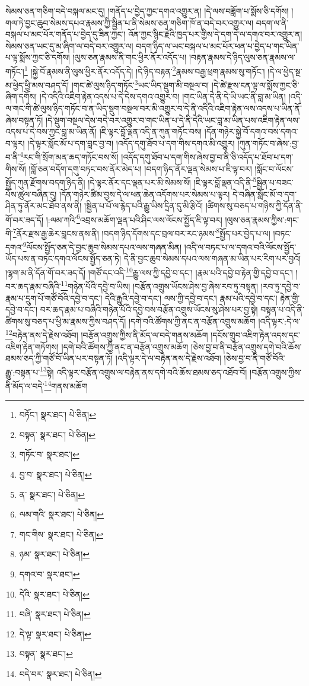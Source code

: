 སེམས་ཅན་གཅིག་བདེ་བསྐལ་མང་དུ། །གནོད་པ་བྱེད་ཀྱང་དགའ་འགྱུར་ན། །དེ་ལས་བཟློག་པ་སྨོས་ཅི་དགོས། །གལ་ཏེ་བྱང་ཆུབ་སེམས་དཔའ་རྣམས་ཀྱི་སྦྱིན་པ་ནི་སེམས་ཅན་གཅིག་ཁོ་ན་བདེ་བར་འགྱུར་ལ། བདག་ལ་ནི་བསྐལ་པ་མང་པོར་གནོད་པ་བྱེད་དུ་ཟིན་ཀྱང་། འོན་ཀྱང་སྙིང་རྗེའི་ཁྱད་པར་གྱིས་དེ་དག་དེ་ལ་དགའ་བར་འགྱུར་ན། སེམས་ཅན་ཡང་དུ་མ་ཞིག་ལ་བདེ་བར་འགྱུར་ལ། བདག་ཉིད་ལ་ཡང་བསྐལ་པ་མང་པོར་ཕན་པ་བྱེད་པ་གང་ཡིན་པ་ལྟ་སྨོས་ཀྱང་ཅི་དགོས། །ལུས་ཅན་རྣམས་ནི་གང་ཕྱིར་ནོར་འདོད་པ། །བརྟན་རྣམས་དེ་ཉིད་ལུས་ཅན་རྣམས་ལ་གཏོང་།\footnote{བཏོང་།  སྣར་ཐང་།  པེ་ཅིན། } །སྐྱེ་བོ་རྣམས་ནི་ལུས་ཕྱིར་ནོར་འདོད་དེ། །དེ་ཉིད་བརྟན་\footnote{བསྟན་  སྣར་ཐང་།  པེ་ཅིན། }རྣམས་བརྒྱ་ཕྲག་རྣམས་སུ་གཏོང་། །དེ་ལ་ཕྱེད་སྔ་མ་ཕྱེད་ཕྱི་མས་བཤད་དོ། །གང་ཚེ་ལུས་ཉིད་གཏོང་\footnote{གཏོང་བ་  སྣར་ཐང་། }ཡང་ཡིད་སྡུག་མི་བསྔལ་བ། །དེ་ཚེ་རྫས་ངན་ལྟ་ལ་སྨོས་ཀྱང་ཅི་ཞིག་དགོས། །དེ་འདིའི་འཇིག་རྟེན་འདས་པ་དེ་དེས་དགའ་འགྱུར་བ། །གང་ཡིན་དེ་ནི་དེ་ཡི་ཡང་ནི་བླ་མ་ཡིན། །འདི་ལ་གང་གི་ཚེ་ལུས་ཉིད་གཏོང་བ་ན་ཡིད་སྡུག་བསྔལ་བར་མི་འགྱུར་བ་དེ་ནི་འདིའི་འཇིག་རྟེན་ལས་འདས་པ་ཡིན་ནོ་ཞེས་བསྟན་ཏོ། །དེ་སྡུག་བསྔལ་དེས་བདེ་བར་འགྱུར་བ་གང་ཡིན་པ་དེ་ནི་དེའི་ཡང་བླ་མ་ཡིན་པས་འཇིག་རྟེན་ལས་འདས་པ་དེ་བས་ཀྱང་བླ་མ་ཡིན་ནོ། །ཇི་ལྟར་བློ་ལྡན་འདི་ན་ཀུན་གཏོང་བས། །དོན་གཉེར་སྐྱེ་བོ་དགའ་བས་དགའ་བ་ལྟར། །དེ་ལྟར་སློང་མོ་པ་དག་བླང་བྱ་བ། །འདོད་དགུ་ཐོབ་པ་དག་གིས་དགའ་མི་འགྱུར། །ཀུན་གཏོང་བ་ཞེས་:བྱ་བ་ནི་\footnote{བྱ་བ་  སྣར་ཐང་།  པེ་ཅིན། }རང་གི་སྲོག་མན་ཆད་གཏོང་བས་སོ། །འདོད་དགུ་ཐོབ་པ་དག་གིས་ཞེས་བྱ་བ་ནི་ཅི་འདོད་པ་ཐོབ་པ་དག་གིས་སོ། །བློ་ཅན་བདོག་དགུ་བཏང་བས་ནོར་མེད་པ། །བདག་ཉིད་ནོར་ལྡན་སེམས་པ་ཇི་ལྟ་བར། །སློང་བ་ལོངས་སྤྱོད་ཀུན་རྫོགས་བདག་ཉིད་ནི། །དེ་ལྟར་ནོར་དང་ལྡན་པར་མི་སེམས་སོ། །ཇི་ལྟར་བློ་ལྡན་འདི་ནི་\footnote{ན་  སྣར་ཐང་།  པེ་ཅིན། }སྦྱིན་པ་བཟང་པོས་ཚུལ་བཞིན་དུ། །དོན་གཉེར་ཚིམ་བྱས་དེ་ལ་ཕན་ཆེན་འདོགས་པར་སེམས་པ་ལྟར། དེ་བཞིན་སློང་མོ་བ་དག་ཤིན་ཏུ་ནོར་མང་ཐོབ་ནས་ནི། །སྦྱིན་པ་པོ་ལ་རྙེད་པའི་རྒྱུ་ཡིས་དྲིན་དུ་མི་རྩིའོ། །ཚིགས་སུ་བཅད་པ་གཉིས་ཀྱི་དོན་ནི་གོ་བར་ཟད་དོ། །:ལམ་ཀའི་\footnote{ལམ་གའི་  སྣར་ཐང་།  པེ་ཅིན། }འབྲས་མཆོག་ལྡན་པའི་ཤིང་ལས་ལོངས་སྤྱོད་ཇི་ལྟ་བར། །ལུས་ཅན་རྣམས་ཀྱིས་:གང་གི་\footnote{གང་གིས་  སྣར་ཐང་།  པེ་ཅིན། }ནོར་རྫས་རྒྱ་ཆེར་བླངས་ནས་ནི། །བདག་ཉིད་དོགས་དང་བྲལ་བར་རང་ཉམས་\footnote{ཉམ་  སྣར་ཐང་།  པེ་ཅིན། }སྤྱོད་པར་བྱེད་པ་ལ། །བཏང་དགའ་\footnote{དགའ་བ་  སྣར་ཐང་། }ལོངས་སྤྱོད་ཅན་དེ་བྱང་ཆུབ་སེམས་དཔའ་ལས་གཞན་མིན། །འདི་ལ་བཏང་པ་ལ་དགའ་བའི་ལོངས་སྤྱོད་ཡོད་པས་ན་བཏང་དགའ་ལོངས་སྤྱོད་ཅན་ཏེ། དེ་ནི་བྱང་ཆུབ་སེམས་དཔའ་ལས་གཞན་མ་ཡིན་པར་རིག་པར་བྱའོ། །ལྷག་མ་ནི་དོན་གོ་བར་ཟད་དོ། །གཙོ་དང་འདི་\footnote{དེའི་  སྣར་ཐང་།  པེ་ཅིན། }རྒྱུ་ལས་ཀྱི་དབྱེ་བ་དང་། །རྣམ་པའི་དབྱེ་བ་རྟེན་གྱི་དབྱེ་བ་དང་། །བར་ཆད་རྣམ་བཞིའི་\footnote{བཞི་  སྣར་ཐང་།  པེ་ཅིན། }གཉེན་པོའི་དབྱེ་བ་ཡིས། །བརྩོན་འགྲུས་ཡོངས་ཤེས་བྱ་ཞེས་རབ་ཏུ་བསྟན། །རབ་ཏུ་དབྱེ་བ་རྣམ་པ་དྲུག་པོ་གཙོ་བོའི་དབྱེ་བ་དང་། དེའི་རྒྱུའི་དབྱེ་བ་དང་། ལས་ཀྱི་དབྱེ་བ་དང་། རྣམ་པའི་དབྱེ་བ་དང་། རྟེན་གྱི་དབྱེ་བ་དང་། བར་ཆད་རྣམ་པ་བཞིའི་གཉེན་པོའི་དབྱེ་བས་བརྩོན་འགྲུས་ཡོངས་སུ་ཤེས་པར་བྱ་སྟེ། བསྟན་པ་འདི་ནི་ཚིགས་སུ་བཅད་པ་ཕྱི་མ་རྣམས་ཀྱིས་བཤད་དོ། །དགེ་བའི་ཚོགས་ཀྱི་ནང་ན་བརྩོན་འགྲུས་མཆོག །འདི་ལྟར་:དེ་ལ་\footnote{དེ་ལྟ་  སྣར་ཐང་།  པེ་ཅིན། }བརྟེན་ནས་དེ་རྗེས་འཐོབ། །བརྩོན་འགྲུས་ཀྱིས་ནི་མོད་ལ་བདེ་གནས་མཆོག །དངོས་གྲུབ་འཇིག་རྟེན་འདས་དང་འཇིག་རྟེན་གཏོགས། །དགེ་བའི་ཚོགས་ཀྱི་ནང་ན་བརྩོན་འགྲུས་མཆོག །ཅེས་བྱ་བ་ནི་བརྩོན་འགྲུས་དགེ་བའི་ཆོས་ཐམས་ཅད་ཀྱི་གཙོ་བོ་ཡིན་པར་བསྟན་ཏོ། །འདི་ལྟར་དེ་ལ་བརྟེན་ནས་དེ་རྗེས་འཐོབ། །ཅེས་བྱ་བ་ནི་གཙོ་བོའི་རྒྱུ་:བསྟན་པ་\footnote{བསྟན་  སྣར་ཐང་། }སྟེ། འདི་ལྟར་བརྩོན་འགྲུས་ལ་བརྟེན་ནས་དགེ་བའི་ཆོས་ཐམས་ཅད་འཐོབ་བོ། །བརྩོན་འགྲུས་ཀྱིས་ནི་མོད་ལ་བདེ་\footnote{བདེ་བར་  སྣར་ཐང་།  པེ་ཅིན། }གནས་མཆོག 
